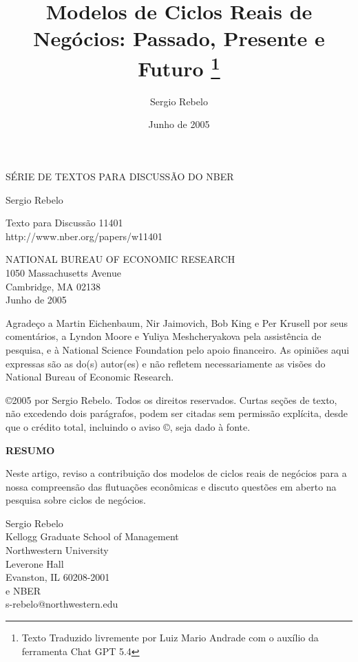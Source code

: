 \documentclass[12pt]{article}
\title{Modelos de Ciclos Reais de Negócios: Passado, Presente e Futuro \thanks{Texto Traduzido livremente por Luiz Mario Andrade com o auxílio da ferramenta Chat GPT 5.4}}
\author{Sergio Rebelo}
\date{Junho de 2005}
\begin{document}
\maketitle

\begin{center}
SÉRIE DE TEXTOS PARA DISCUSSÃO DO NBER

\vspace{1cm}

Sergio Rebelo

Texto para Discussão 11401 \\
http://www.nber.org/papers/w11401

NATIONAL BUREAU OF ECONOMIC RESEARCH \\
1050 Massachusetts Avenue \\
Cambridge, MA 02138 \\
Junho de 2005
\end{center}

\vspace{1cm}

Agradeço a Martin Eichenbaum, Nir Jaimovich, Bob King e Per Krusell por seus comentários, a Lyndon Moore e Yuliya Meshcheryakova pela assistência de pesquisa, e à National Science Foundation pelo apoio financeiro. As opiniões aqui expressas são as do(s) autor(es) e não refletem necessariamente as visões do National Bureau of Economic Research.

©2005 por Sergio Rebelo. Todos os direitos reservados. Curtas seções de texto, não excedendo dois parágrafos, podem ser citadas sem permissão explícita, desde que o crédito total, incluindo o aviso ©, seja dado à fonte.

\newpage

\begin{center}
\textbf{RESUMO}
\end{center}

Neste artigo, reviso a contribuição dos modelos de ciclos reais de negócios para a nossa compreensão das flutuações econômicas e discuto questões em aberto na pesquisa sobre ciclos de negócios.

\vspace{1cm}

Sergio Rebelo \\
Kellogg Graduate School of Management \\
Northwestern University \\
Leverone Hall \\
Evanston, IL 60208-2001 \\
e NBER \\
s-rebelo@northwestern.edu
\end{document}
